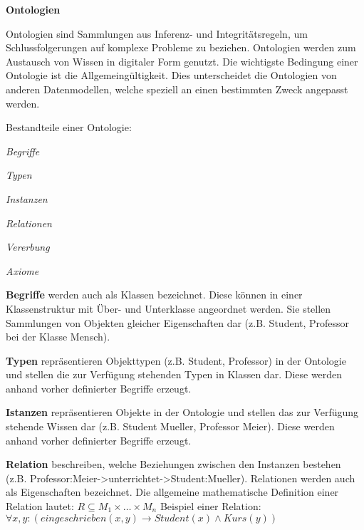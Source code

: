 \textbf{Ontologien}

Ontologien sind Sammlungen aus Inferenz- und Integrit{\"a}tsregeln, um
Schlussfolgerungen auf komplexe Probleme zu beziehen. Ontologien werden zum
Austausch von Wissen in digitaler Form genutzt. Die wichtigste Bedingung einer
Ontologie ist die Allgemeing{\"u}ltigkeit. Dies unterscheidet die Ontologien von
anderen Datenmodellen, welche speziell an einen bestimmten Zweck angepasst
werden.

Bestandteile einer Ontologie:

 \begin{compactenum}[I]
     \item \textit{Begriffe}
     \item \textit{Typen}
     \item \textit{Instanzen}
     \item \textit{Relationen}
     \item \textit{Vererbung}
     \item \textit{Axiome}
   \end{compactenum}
   
   \textbf{Begriffe} werden auch als Klassen bezeichnet. Diese
   k{\"o}nnen in einer Klassenstruktur mit {\"U}ber- und Unterklasse angeordnet
   werden. Sie stellen Sammlungen von Objekten gleicher Eigenschaften dar
   (z.B. Student, Professor bei der Klasse Mensch).
   
   \textbf{Typen} repr{\"a}sentieren Objekttypen (z.B. Student, Professor) in
   der Ontologie und stellen die zur Verf{\"u}gung stehenden Typen in Klassen dar.
   Diese werden anhand vorher definierter Begriffe erzeugt.
   
   \textbf{Istanzen} repr{\"a}sentieren Objekte in
   der Ontologie und stellen das zur Verf{\"u}gung stehende Wissen dar
   (z.B. Student Mueller, Professor Meier). Diese werden anhand vorher
   definierter Begriffe erzeugt.
   
   \textbf{Relation} beschreiben, welche Beziehungen zwischen den Instanzen
   bestehen (z.B. Professor:Meier->unterrichtet->Student:Mueller). Relationen
   werden auch als Eigenschaften bezeichnet. 
   \newline
   Die allgemeine mathematische Definition einer Relation lautet:
   \newline    \newline
   $R \subseteq M_1 \times \ldots \times M_n$
   \newline
   Beispiel einer Relation:
   \newline    \newline
   $\forall x,y : (eingeschrieben(x,y) \rightarrow Student(x) \wedge Kurs(y))$
   
